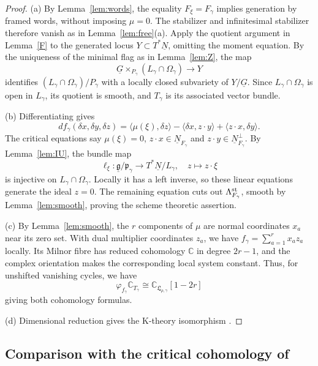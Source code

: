 \documentclass[11pt,reqno]{amsart}
\theoremstyle{definition}
\theoremstyle{remark}
\def\bbC{\mathbb C}
\def\dN{\underline N}
\def\dG{\underline G}
\def\dg{\underline{\mathfrak g}}
\def\frakp{\mathfrak p}
\begin{document}
\begin{proof}
(a) By Lemma~\ref{lem:words}, the equality $F_\xi=F_\gamma$ implies generation
by framed words, without imposing $\mu=0$. The stabilizer and
infinitesimal stabilizer therefore vanish as in Lemma~\ref{lem:free}(a).
Apply the quotient argument in Lemma~\ref{F} to the generated locus
$Y\subset T^*\dN$, omitting the moment equation.
By the uniqueness of the minimal flag as in Lemma~\ref{lem:Z},
the map $$\dG\times_{P_\gamma}(L_\gamma\cap\Omega_\gamma)\to Y$$ identifies
$(L_\gamma\cap\Omega_\gamma)/P_\gamma$ with a locally closed subvariety of $Y/\dG$.
Since $L_\gamma\cap\Omega_\gamma$ is open in $L_\gamma$, its quotient is
smooth, and $T_\gamma$ is its associated vector bundle.

(b) Differentiating gives
\[
 df_\gamma(\delta x,\delta y,\delta z)
 =\langle\mu(\xi),\delta z\rangle
 -\langle\delta x,z\cdot y\rangle
 +\langle z\cdot x,\delta y\rangle.
\]
The critical equations say $\mu(\xi)=0$,
$z\cdot x\in\dN_{F_\gamma}$ and
$z\cdot y\in\dN_{F_\gamma}^{\perp}$.
By Lemma~\ref{lem:IU}, the bundle map
\[
 \ell_\xi:\dg/\frakp_\gamma\longrightarrow T^*\dN/L_\gamma,
 \quad z\longmapsto z\cdot\xi
\]
is injective on $L_\gamma\cap\Omega_\gamma$. Locally it has a left inverse, so these
linear equations generate the ideal $z=0$. The remaining equation
cuts out $\Lambda_{F_\gamma}^{\rm st}$, smooth by
Lemma~\ref{lem:smooth}, proving the scheme theoretic assertion.

(c) By Lemma~\ref{lem:smooth}, the $r$ components of $\mu$
are normal coordinates $x_a$ near its zero set. With dual
multiplier coordinates $z_a$, we have
$f_\gamma=\sum_{a=1}^r x_a z_a$ locally.
Its Milnor fibre has reduced cohomology $\bbC$ in degree
$2r-1$, and the complex orientation makes the corresponding local
system constant. Thus, for unshifted vanishing cycles, we have
$$\varphi_{f_\gamma}\bbC_{T_\gamma}\cong
\bbC_{\mathfrak L_{\rho,\gamma}}[1-2r]$$
giving both cohomology formulas. 

(d) Dimensional reduction
gives the K-theory isomorphism \cite[\S2.1, Prop.~4.6]{VV23}.
\end{proof}


\subsection{Comparison with the critical cohomology of \cite{VV23}}\label{subsec:ns-VV23}
\end{document}

